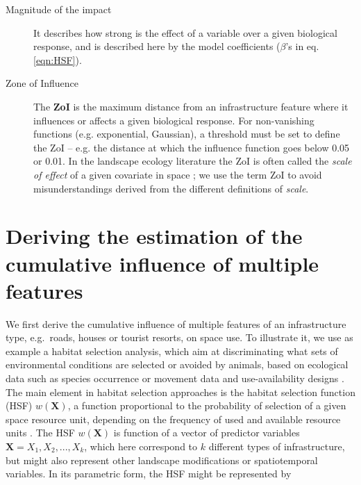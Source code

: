 \documentclass[titlepage]{article}
\begin{document}
\begin{tcolorbox}[width=1.3\textwidth,center,colback=yellow!5,colframe=yellow!75!black,title={Box 1 -- Definitions}]
\begin{description}
    \item[Magnitude of the impact] It describes how strong is the effect of a variable over a given biological response, and is described here by the model coefficients ($\beta$'s in eq. \ref{eqn:HSF}). 
    
    \item[Zone of Influence] The \textbf{ZoI} is the maximum distance from an infrastructure feature where it influences or affects a given biological response. For non-vanishing functions (e.g. exponential, Gaussian), a threshold must be set to define the ZoI -- e.g. the distance at which the influence function goes below 0.05 or 0.01. 
    In the landscape ecology literature the ZoI is often called the \textit{scale of effect} of a given covariate in space \citep[e.g.][]{jackson_are_2015}; we use the term ZoI to avoid misunderstandings derived from the different definitions of \textit{scale}. 
    

\end{description}
\end{tcolorbox}

\section{Deriving the estimation of the cumulative influence of multiple features}

We first derive the cumulative influence of multiple features of an infrastructure type, e.g.\ roads, houses or tourist resorts, on space use. To illustrate it, we use as example a habitat selection analysis, which aim at discriminating what sets of environmental conditions are selected or avoided by animals, based on ecological data such as species occurrence or movement data and use-availability designs \citep{fieberg_how_2021}. The main element in habitat selection approaches is the habitat selection function (HSF) $w(\textbf{X})$, a function proportional to the probability of selection of a given space resource unit, depending on the frequency of used and available resource units \citep{thurfjell_applications_2014}. The HSF $w(\textbf{X})$ is function of a vector of predictor variables $\textbf{X} = X_1,X_2, ...,  X_k$, which here correspond to $k$ different types of infrastructure, but might also represent other landscape modifications or spatiotemporal variables. In its parametric form, the HSF might be represented by
\end{document}
